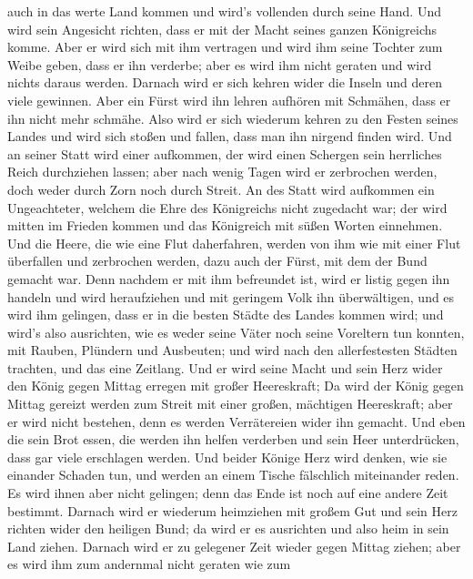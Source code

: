 auch in das werte Land kommen und wird's vollenden durch seine Hand.
 Und wird sein Angesicht richten, dass er mit der Macht
seines ganzen Königreichs komme. Aber er wird sich mit ihm vertragen und
wird ihm seine Tochter zum Weibe geben, dass er ihn verderbe; aber es
wird ihm nicht geraten und wird nichts daraus werden. 
Darnach wird er sich kehren wider die Inseln und deren viele gewinnen.
Aber ein Fürst wird ihn lehren aufhören mit Schmähen, dass er ihn nicht
mehr schmähe.  Also wird er sich wiederum kehren zu den
Festen seines Landes und wird sich stoßen und fallen, dass man ihn
nirgend finden wird.  Und an seiner Statt wird einer
aufkommen, der wird einen Schergen sein herrliches Reich durchziehen
lassen; aber nach wenig Tagen wird er zerbrochen werden, doch weder
durch Zorn noch durch Streit.  An des Statt wird aufkommen
ein Ungeachteter, welchem die Ehre des Königreichs nicht zugedacht war;
der wird mitten im Frieden kommen und das Königreich mit süßen Worten
einnehmen.  Und die Heere, die wie eine Flut daherfahren,
werden von ihm wie mit einer Flut überfallen und zerbrochen werden, dazu
auch der Fürst, mit dem der Bund gemacht war.  Denn nachdem
er mit ihm befreundet ist, wird er listig gegen ihn handeln und wird
heraufziehen und mit geringem Volk ihn überwältigen,  und
es wird ihm gelingen, dass er in die besten Städte des Landes kommen
wird; und wird's also ausrichten, wie es weder seine Väter noch seine
Voreltern tun konnten, mit Rauben, Plündern und Ausbeuten; und wird nach
den allerfestesten Städten trachten, und das eine Zeitlang.
 Und er wird seine Macht und sein Herz wider den König
gegen Mittag erregen mit großer Heereskraft; Da wird der König gegen
Mittag gereizt werden zum Streit mit einer großen, mächtigen
Heereskraft; aber er wird nicht bestehen, denn es werden Verrätereien
wider ihn gemacht.  Und eben die sein Brot essen, die
werden ihn helfen verderben und sein Heer unterdrücken, dass gar viele
erschlagen werden.  Und beider Könige Herz wird denken, wie
sie einander Schaden tun, und werden an einem Tische fälschlich
miteinander reden. Es wird ihnen aber nicht gelingen; denn das Ende ist
noch auf eine andere Zeit bestimmt.  Darnach wird er
wiederum heimziehen mit großem Gut und sein Herz richten wider den
heiligen Bund; da wird er es ausrichten und also heim in sein Land
ziehen.  Darnach wird er zu gelegener Zeit wieder gegen
Mittag ziehen; aber es wird ihm zum andernmal nicht geraten wie zum
